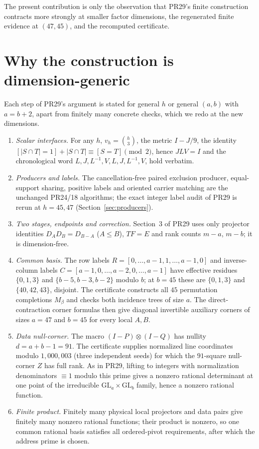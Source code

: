 \documentclass[11pt]{article}
\begin{document}
The present contribution is only the observation that PR29's finite
construction contracts more strongly at smaller factor dimensions, the
regenerated finite evidence at $(47,45)$, and the recomputed certificate.

\section{Why the construction is dimension-generic}
Each step of PR29's argument is stated for general $h$ or general
$(a,b)$ with $a=b+2$, apart from finitely many concrete checks, which we
redo at the new dimensions.
\begin{enumerate}
\item \emph{Scalar interfaces.} For any $h$, $v_h=\binom h3$, the metric
$I-J/9$, the identity $[|S\cap T|=1]+|S\cap T|\equiv[S=T]\pmod 2$, hence
$JLV=I$ and the chronological word $L,J,L^{-1},V,L,J,L^{-1},V$, hold verbatim.
\item \emph{Producers and labels.} The cancellation-free paired exclusion
producer, equal-support sharing, positive labels and oriented carrier
matching are the unchanged PR24/18 algorithms; the exact integer label audit
of PR29 is rerun at $h=45,47$ (Section~\ref{sec:producers}).
\item \emph{Two stages, endpoints and correction.} Section~3 of PR29 uses
only projector identities $D_AD_B=D_{B-A}$ ($A\le B$), $TF=E$ and rank
counts $m-a$, $m-b$; it is dimension-free.
\item \emph{Common basis.} The row labels
$R=[0,\ldots,a-1,1,\ldots,a-1,0]$ and inverse-column labels
$C=[a-1,0,\ldots,a-2,0,\ldots,a-1]$ have effective residues $\{0,1,3\}$ and
$\{b-5,b-3,b-2\}$ modulo $b$; at $b=45$ these are $\{0,1,3\}$ and
$\{40,42,43\}$, disjoint. The certificate constructs all $45$ permutation
completions $M_\beta$ and checks both incidence trees of size $a$.
The direct-contraction corner formulas then give diagonal invertible
auxiliary corners of sizes $a=47$ and $b=45$ for every local $A,B$.
\item \emph{Data null-corner.} The macro $(I-P)\otimes(I-Q)$ has nullity
$d=a+b-1=91$. The certificate supplies normalized line coordinates modulo
$1{,}000{,}003$ (three independent seeds) for which the $91$-square
null-corner $Z$ has full rank. As in PR29, lifting to integers with
normalization denominators $\equiv1$ modulo this prime gives a nonzero
rational determinant at one point of the irreducible
$\mathrm{GL}_a\times\mathrm{GL}_b$ family, hence a nonzero rational function.
\item \emph{Finite product.} Finitely many physical local projectors and data
pairs give finitely many nonzero rational functions; their product is
nonzero, so one common rational basis satisfies all ordered-pivot
requirements, after which the address prime is chosen.
\end{enumerate}
\end{document}
